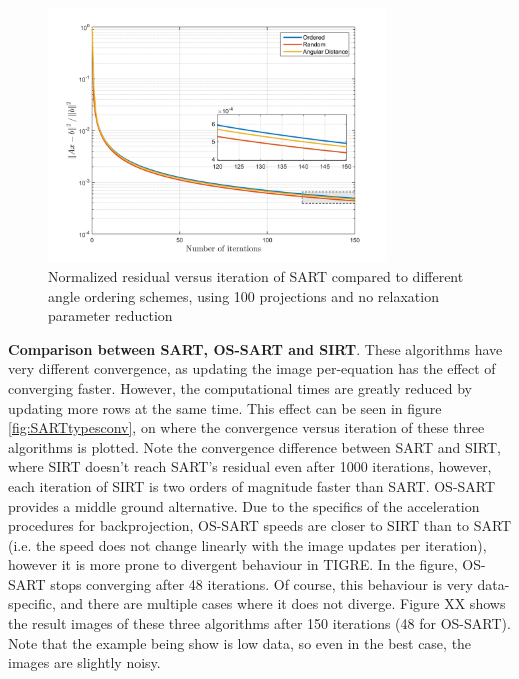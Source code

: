 \begin{figure}[H]
\begin{center}

\includegraphics[width=0.8\textwidth]{Applications/SARTangles.png} 
\end{center}

\caption[Nomralized residual vs iteration of SART vs projection update order]{\label{fig:SARTanglesconv} Normalized residual versus iteration of SART compared to different angle ordering schemes, using 100 projections and no relaxation parameter reduction} 
\end{figure}

\textbf{Comparison between SART, OS-SART and SIRT}. These algorithms have very different convergence, as updating the image per-equation has the effect of converging faster. However, the computational times are greatly reduced by updating more rows at the same time. This effect can be seen in figure \ref{fig:SARTtypesconv}, on where the convergence versus iteration of these three algorithms is plotted. Note the convergence difference between SART and SIRT, where SIRT doesn't reach SART's residual even after 1000 iterations, however, each iteration of SIRT is two orders of magnitude faster than SART. OS-SART provides a middle ground alternative. Due to the specifics of the acceleration procedures for backprojection, OS-SART speeds are closer to SIRT than to SART (i.e. the speed does not change linearly with the image updates per iteration), however it is more prone to divergent behaviour in TIGRE. In the figure, OS-SART stops converging after 48 iterations. Of course, this behaviour is very data-specific, and there are multiple cases where it does not diverge. Figure XX shows the result images of these three algorithms after 150 iterations (48 for OS-SART). Note that the example being show is low data, so even in the best case, the images are slightly noisy.



